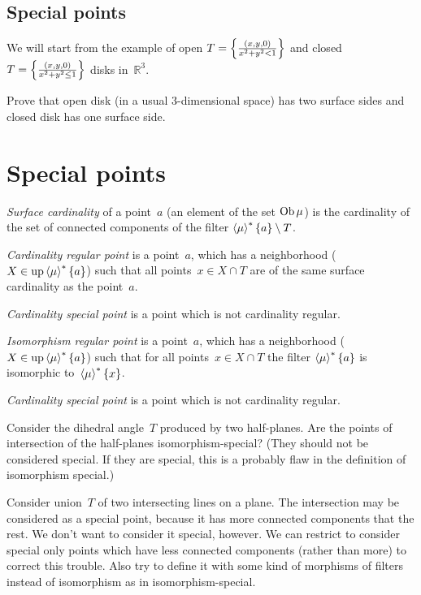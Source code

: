 \subsection{Special points}

We will start from the example of open $T=\left\{ \frac{(x,y,0)}{x^2+y^2<1}\right\}$
and closed $T=\left\{ \frac{(x,y,0)}{x^2+y^2\leq 1}\right\}$ disks in~$\mathbb{R}^3$.

\begin{xca}
Prove that open disk (in a usual 3-dimensional space) has two surface sides
and closed disk has one surface side.
\end{xca}

\section{Special points}

\begin{defn}
\emph{Surface cardinality} of a point~$a$ (an element of the set $\operatorname{Ob}\mu$) is
the cardinality of the set of connected components of the filter
$\left\langle \mu\right\rangle ^{\ast}\{a\}\setminus T$.
\end{defn}

\begin{defn}
\emph{Cardinality regular point} is a point~$a$, which has a neighborhood
($X\in\operatorname{up}\left\langle \mu\right\rangle ^{\ast}\{a\}$) such that all points~$x\in X\cap T$
are of the same surface cardinality as the point~$a$.

\emph{Cardinality special point} is a point which is not cardinality regular.
\end{defn}

\begin{defn}
\emph{Isomorphism regular point} is a point~$a$, which has a neighborhood
($X\in\operatorname{up}\left\langle \mu\right\rangle ^{\ast}\{a\}$) such that for all points~$x\in X\cap T$
the filter $\left\langle \mu\right\rangle ^{\ast}\{a\}$ is isomorphic
to~$\left\langle \mu\right\rangle ^{\ast}\{x\}$.

\emph{Cardinality special point} is a point which is not cardinality regular.
\end{defn}


Consider the dihedral angle~$T$ produced by two half-planes. Are the points of
intersection of the half-planes isomorphism-special? (They should not
be considered special. If they are special, this is a probably flaw in
the definition of isomorphism special.)

Consider union~$T$ of two intersecting lines on a plane. The intersection
may be considered as a special point, because it has more connected
components that the rest. We don't want to consider it special, however.
We can restrict to consider special only points which have less connected
components (rather than more) to correct this trouble. Also try to define
it with some kind of morphisms of filters instead of isomorphism as in
isomorphism-special.

